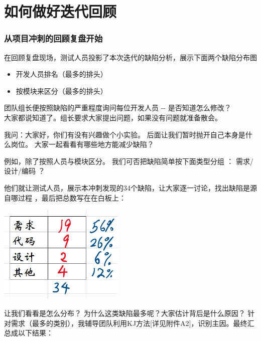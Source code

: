 \chapter{如何做好迭代回顾} %


\hypertarget{ux4eceux9879ux76eeux51b2ux523aux7684ux56deux987eux590dux76d8ux5f00ux59cb}{%
\subsection{从项目冲刺的回顾复盘开始}\label{ux4eceux9879ux76eeux51b2ux523aux7684ux56deux987eux590dux76d8ux5f00ux59cb}}

在回顾复盘现场，测试人员投影了本次迭代的缺陷分析，展示下面两个缺陷分布图
\begin{itemize}
\tightlist
\item
  开发人员排名（最多的排头）
\item
  按模块来区分（最多的排头）
\end{itemize}

团队组长便按照缺陷的严重程度询问每位开发人员 -\/- 是否知道怎么修改？\\
大家都说知道了。组长要求大家提出问题，如果没有问题就准备散会。

我问：大家好，你们有没有兴趣做个小实验。
后面让我们暂时抛开自己本身是什么岗位。
大家一起看看有哪些地方能减少缺陷？

例如，除了按照人员与模块区分。 我们可否把缺陷简单按下面类型分组 ：
需求/设计/编码 ？

他们就让测试人员，展示本冲刺发现的34个缺陷，让大家逐一讨论，找出缺陷是源自哪过程
，最后把总数写在在白板上：


\includegraphics[width=6cm]{DefectsBySourceScreenshot_2021-09-20_155232.png}

让我们看看是怎么分布？ 为什么这类缺陷最多呢？大家估计背后是什么原因？
针对需求（最多的类别），我辅导团队利用KJ方法{[}详见附件A2{]}，识别主因。最终汇总成以下结果：\\


